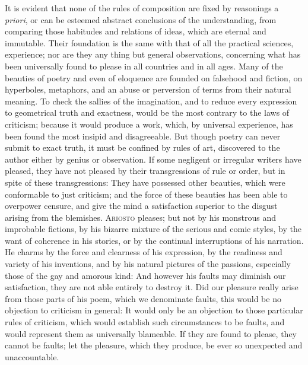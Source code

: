 It is evident that none of the rules of composition are fixed by
reasonings a \textit{priori}, or can be esteemed abstract conclusions
of the understanding, from comparing those habitudes and relations of
ideas, which are eternal and immutable. Their foundation is the same
with that of all the practical sciences, experience; nor are they any
thing but general observations, concerning what has been universally
found to please in all countries and in all ages. Many of the beauties
of poetry and even of eloquence are founded on falsehood and fiction,
on hyperboles, metaphors, and an abuse or perversion of terms from
their natural meaning. To check the sallies of the imagination, and to
reduce every expression to  geometrical truth and exactness,
would be the most contrary to the laws of criticism; because it would
produce a work, which, by universal experience, has been found the
most insipid and disagreeable. But though poetry can never submit to
exact truth, it must be confined by rules of art, discovered to the
author either by genius or observation. If some negligent or irregular
writers have pleased, they have not pleased by their transgressions of
rule or order, but in spite of these transgressions: They have
possessed other beauties, which were conformable to just criticism;
and the force of these beauties has been able to overpower censure,
and give the mind a satisfaction superior to the disgust arising from
the blemishes. \textsc{Ariosto} pleases; but not by his monstrous and
improbable fictions, by his bizarre mixture of the serious and comic
styles, by the want of coherence in his stories, or by the continual
interruptions of his narration. He charms by the force and clearness
of his expression, by the readiness and variety of his inventions, and
by his natural pictures of the passions, especially those of the gay
and amorous kind: And however his faults may diminish our
satisfaction, they are not able entirely to destroy it. Did our
pleasure really arise from those parts of his poem, which we
denominate faults, this would be no objection to criticism in general:
It would only be an objection to those particular rules of criticism,
which would establish such circumstances to be faults, and would
represent them as universally blameable. If they are found to please,
they cannot be faults; let the pleasure, which they produce, be ever
so unexpected and unaccountable.

